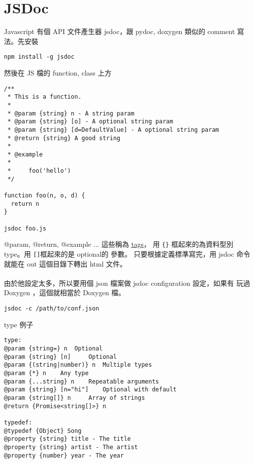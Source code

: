   \section{JSDoc}
  Javascript 有個 API 文件產生器 jsdoc，跟 pydoc, doxygen 類似的 comment
  寫法。先安裝
  \begin{verbatim}
npm install -g jsdoc
  \end{verbatim}
  然後在 JS 檔的 function, class 上方
  \begin{verbatim}
/**
 * This is a function.
 *
 * @param {string} n - A string param
 * @param {string} [o] - A optional string param
 * @param {string} [d=DefaultValue] - A optional string param
 * @return {string} A good string
 *
 * @example
 *
 *     foo('hello')
 */

function foo(n, o, d) {
  return n
}

jsdoc foo.js
  \end{verbatim}
  @param, @return, @example ... 這些稱為
  \href{https://jsdoc.app/#block-tags}{tags}，
  用 \verb={}= 框起來的為資料型別 type。用 \verb=[]=框起來的是 optional的
  參數。 只要根據定義標準寫完，用 jsdoc 命令就能在 out 這個目錄下轉出 html
  文件。
  \\\\
  由於他設定太多，所以要用個 json 檔案做 jsdoc configuration 設定，如果有
  玩過 Doxygen ，這個就相當於 Doxygen 檔。
  \begin{verbatim}
jsdoc -c /path/to/conf.json
  \end{verbatim}
  type 例子
  \begin{verbatim}
type:
@param {string=} n 	Optional
@param {string} [n] 	Optional
@param {(string|number)} n 	Multiple types
@param {*} n 	Any type
@param {...string} n 	Repeatable arguments
@param {string} [n="hi"] 	Optional with default
@param {string[]} n 	Array of strings
@return {Promise<string[]>} n

typedef:
@typedef {Object} Song
@property {string} title - The title
@property {string} artist - The artist
@property {number} year - The year
  \end{verbatim}

